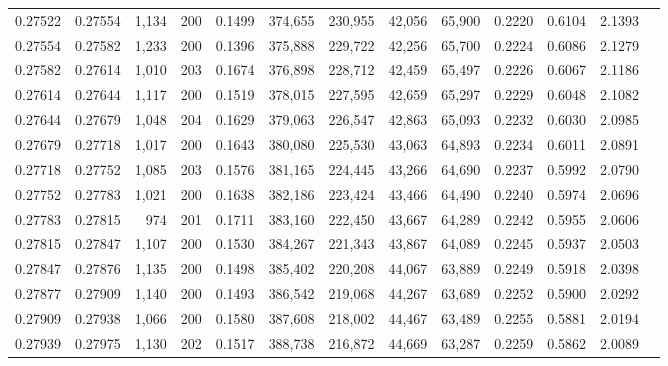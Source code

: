 \begin{tabular}{rrrrrrrrrrrrr}
0.27522 & 0.27554 & 1,134 & 200 &                                     0.1499 & 374,655 & 230,955 &  42,056 &  65,900 & 0.2220 & 0.6104 & 2.1393 \\
0.27554 & 0.27582 & 1,233 & 200 &                                     0.1396 & 375,888 & 229,722 &  42,256 &  65,700 & 0.2224 & 0.6086 & 2.1279 \\
0.27582 & 0.27614 & 1,010 & 203 &                                     0.1674 & 376,898 & 228,712 &  42,459 &  65,497 & 0.2226 & 0.6067 & 2.1186 \\
0.27614 & 0.27644 & 1,117 & 200 &                                     0.1519 & 378,015 & 227,595 &  42,659 &  65,297 & 0.2229 & 0.6048 & 2.1082 \\
0.27644 & 0.27679 & 1,048 & 204 &                                     0.1629 & 379,063 & 226,547 &  42,863 &  65,093 & 0.2232 & 0.6030 & 2.0985 \\
0.27679 & 0.27718 & 1,017 & 200 &                                     0.1643 & 380,080 & 225,530 &  43,063 &  64,893 & 0.2234 & 0.6011 & 2.0891 \\
0.27718 & 0.27752 & 1,085 & 203 &                                     0.1576 & 381,165 & 224,445 &  43,266 &  64,690 & 0.2237 & 0.5992 & 2.0790 \\
0.27752 & 0.27783 & 1,021 & 200 &                                     0.1638 & 382,186 & 223,424 &  43,466 &  64,490 & 0.2240 & 0.5974 & 2.0696 \\
0.27783 & 0.27815 &   974 & 201 &                                     0.1711 & 383,160 & 222,450 &  43,667 &  64,289 & 0.2242 & 0.5955 & 2.0606 \\
0.27815 & 0.27847 & 1,107 & 200 &                                     0.1530 & 384,267 & 221,343 &  43,867 &  64,089 & 0.2245 & 0.5937 & 2.0503 \\
0.27847 & 0.27876 & 1,135 & 200 &                                     0.1498 & 385,402 & 220,208 &  44,067 &  63,889 & 0.2249 & 0.5918 & 2.0398 \\
0.27877 & 0.27909 & 1,140 & 200 &                                     0.1493 & 386,542 & 219,068 &  44,267 &  63,689 & 0.2252 & 0.5900 & 2.0292 \\
0.27909 & 0.27938 & 1,066 & 200 &                                     0.1580 & 387,608 & 218,002 &  44,467 &  63,489 & 0.2255 & 0.5881 & 2.0194 \\
0.27939 & 0.27975 & 1,130 & 202 &                                     0.1517 & 388,738 & 216,872 &  44,669 &  63,287 & 0.2259 & 0.5862 & 2.0089 \\

\end{tabular}
